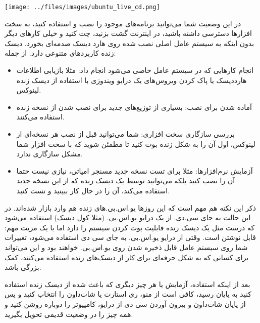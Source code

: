 \texttt{[image: ../files/images/ubuntu\_live\_cd.png]}

در این وضعیت شما می‌توانید برنامه‌های موجود را نصب و استفاده کنید، به سخت افزارها دسترسی داشته باشید، در اینترنت گشت بزنید، چت کنید و خیلی کارهای دیگر بدون اینکه به سیستم عامل اصلی نصب شده روی هارد دیسک صدمه‌ای بخورد. دیسک زنده کاربردهای متنوعی دارد. از جمله:
\begin{itemize}
	\item انجام کارهایی که در سیستم عامل خاصی می‌شود انجام داد: مثلا بازیابی اطلاعات هارددیسک یا پاک کردن ویروس‌های یک درایو ویندوزی با استفاده از دیسک زنده لینوکس.
	\item آماده شدن برای نصب: بسیاری از توزیع‌های جدید برای نصب شدن از نسخه زنده استفاده می‌کنند.
	\item بررسی سازگاری سخت افزاری: شما می‌توانید قبل از نصب هر نسخه‌ای از لینوکس، اول آن را به شکل زنده بوت کنید تا مطمئن شوید که با سخت افزار شما مشکل سازگاری ندارد.
	\item آزمایش نرم‌افزارها: مثلا برای تست نسخه جدید مسنجر امپاتی، نیازی نیست حتما آن را نصب کنید بلکه می‌توانید توسط یک دیسک زنده که از این نسخه جدید استفاده می‌کند، آن را در حال کار ببینید و تست کنید.
\end{itemize}
ذکر این نکته هم مهم است که این روزها یو.اس.بی.های زنده هم وارد بازار شده‌اند. در این حالت به جای سی.دی. از یک درایو یو.اس.بی. (مثلا کول دیسک) استفاده می‌شود که درست مثل یک دیسک زنده قابلیت بوت کردن سیستم را دارد اما با یک مزیت مهم: قابل نوشتن است. وقتی از درایو یو.اس.بی. به جای سی دی استفاده می‌شود، تغییرات شما روی سیستم عامل قابل ذخیره شدن روی یو.اس.بی. خواهند بود و این می‌تواند برای کسانی که به شکل حرفه‌ای برای کار از دیسک‌های زنده استفاده می‌کنند، کمک بزرگی باشد.

بعد از اینکه استفاده، آزمایش یا هر چیز دیگری که باعث شده از دیسک زنده استفاده کنید به پایان رسید، کافی است از منو، ری استارت یا شات‌داون را انتخاب کنید و پس از پایان شات‌داون و بیرون آوردن سی دی از درایو، کامپیوتر را دوباره روشن کنید و همه چیز را در وضعیت قدیمی تحویل بگیرید.

